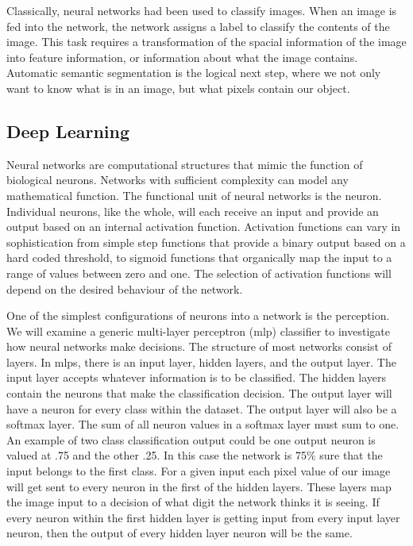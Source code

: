 \documentclass[12pt]{article}
\begin{document}
Classically, neural networks had been used to classify images.
When an image is fed into the network, the network assigns a label to classify the contents of the image.
This task requires a transformation of the spacial information of the image into feature information, or information about what the image contains. 
Automatic semantic segmentation is the logical next step, where we not only want to know what is in an image, but what pixels contain our object.

\subsection{Deep Learning}
\par %
Neural networks are computational structures that mimic the function of biological neurons. Networks with sufficient complexity can model any mathematical function. 
The functional unit of neural networks is the neuron.
Individual neurons, like the whole, will each receive an input and provide an output based on an internal activation function.
Activation functions can vary in sophistication from simple step functions that provide a binary output based on a hard coded threshold,
to sigmoid functions that organically map the input to a range of values between zero and one.
The selection of activation functions will depend on the desired behaviour of the network. 
\par
One of the simplest configurations of neurons into a network is the perception.
We will examine a generic multi-layer perceptron (mlp) classifier to investigate how neural networks make decisions.
The structure of most networks consist of layers. In mlps, there is an input layer, hidden layers, and the output layer. 
The input layer accepts whatever information is to be classified. The hidden layers contain the neurons that make the classification decision.
The output layer will have a neuron for every class within the dataset. The output layer will also be a softmax layer. 
The sum of all neuron values in a softmax layer must sum to one.
An example of two class classification output could be one output neuron is valued at .75 and the other .25.
In this case the network is 75\% sure that the input belongs to the first class.
For a given input each pixel value of our image will get sent to every neuron in the first of the hidden layers.
These layers map the image input to a decision of what digit the network thinks it is seeing.
If every neuron within the first hidden layer is getting input from every input layer neuron, then the output of every hidden layer neuron will be the same. 
\end{document}
